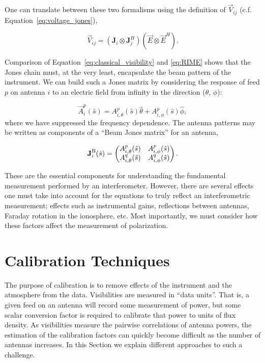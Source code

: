 One can translate between these two formalisms using the definition of $\vec{V}_{ij}$ (c.f. Equation~\ref{eq:voltage_jones}),

\begin{equation}
\vec{V}_{ij} = (\textbf{J}_i \otimes \textbf{J}_j^H)(\vec{E}\otimes\vec{E}^H).
\end{equation}

Comparison of Equation~\ref{eq:classical_visibility} and \ref{eq:RIME} shows that the Jones chain must, at the very least, encapsulate the beam pattern of the instrument. We can build such a Jones matrix by considering the response of feed $p$ on antenna $i$ to an electric field from infinity in the direction ($\theta$, $\phi$):

\begin{equation}
\vec{A}_i^p(\hat{s}) = A^p_{i,\theta}(\hat{s})\hat{\theta} + A^p_{i,\phi}(\hat{s})\hat{\phi},
\end{equation}
where we have suppressed the frequency dependence. The antenna patterns may be written as components of a ``Beam Jones matrix'' for an antenna,

\begin{equation}
\textbf{J}_i^{\rm B}(\hat{s}) = 
\begin{pmatrix}
A^p_{i,\theta}(\hat{s}) & A^p_{i,\phi}(\hat{s}) \\
A^q_{i,\theta}(\hat{s}) & A^q_{i,\phi}(\hat{s}) \\
\end{pmatrix}.
\label{eq:jones-beam}
\end{equation}

These are the essential components for understanding the fundamental measurement performed by an interferometer. However, there are several effects one must take into account for the equations to truly reflect an interferometric measurement; effects such as instrumental gains, reflections between antennas, Faraday rotation in the ionosphere, etc. Most importantly, we must consider how these factors affect the measurement of polarization.

\section{Calibration Techniques}
\label{sec:interferometry_cal}

The purpose of calibration is to remove effects of the instrument and the atmosphere from the data. Visibilities are measured in ``data units''. That is, a given feed on an antenna will record some measurement of power, but some scalar conversion factor is required to calibrate that power to units of flux density. As visibilities measure the pairwise correlations of antenna powers, the estimation of the calibration factors can quickly become difficult as the number of antennas increases. In this Section we explain different approaches to such a challenge.

